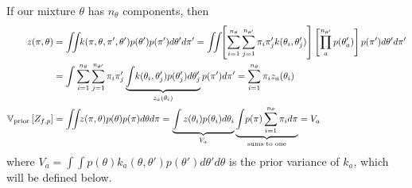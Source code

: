 



If our mixture $\theta$ has $n_\theta$ components, then
%
\begin{align}
\nonumber  
z(\vpi, \vtheta) & = \int\!\!\! \int\!\! k(\vpi, \vtheta, \vpi', \vtheta') p(\vtheta') p(\vpi') d\vtheta' d\vpi' = \int\!\!\! \int\!\! \left[ \sum_{i=1}^{n_\theta} \sum_{j=1}^{n_{\theta'}} \pi_i \pi_j' k(\theta_i, \theta_j') \right] \left[ \prod_a^{n_{\theta'}} p(\theta'_a ) \right] p(\vpi') d\vtheta' d\vpi' \\
& = \int \sum_{i=1}^{n_\theta} \sum_{j=1}^{n_{\theta'}} \pi_i \pi_j' \underbrace{\int\! k(\theta_i, \theta_j') p(\theta'_j) d\theta'_j}_{z_a(\theta_i)} p(\vpi') d\vpi'
 =  \sum_{i=1}^{n_{\theta}} \pi_i z_a(\theta_i)
\label{eq:little_z_dp} \\
%
%
\varianceargs{\textrm{prior}}{Z_{f,p}} & = 
\int\!\!\! \int\! \! z( \pi, \theta) p(\theta) p(\pi) d\theta d\pi
 = \underbrace{\int z(\theta_i) p(\theta_i ) d\theta_i}_{V_a} \underbrace{ \int \! p(\pi) \sum_{i=1}^{n_{\theta}} \pi_i d\vpi}_{ \textrm{sums to one} }
 = V_a
\label{eq:prior_variance_gmm}
\end{align}
%
where $V_a = \int\!\! \int\! p(\theta) k_a( \theta, \theta') p(\theta') d\theta' d\theta$ is the prior variance of $k_a$, which will be defined below.

